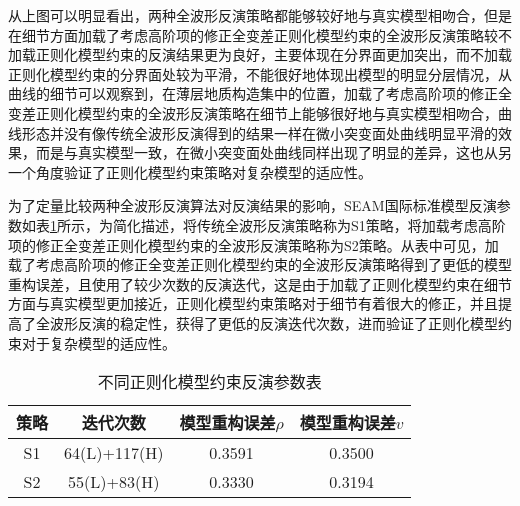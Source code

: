 \documentclass[12pt]{article}
\begin{document}
\par
从上图可以明显看出，两种全波形反演策略都能够较好地与真实模型相吻合，但是在细节方面加载了考虑高阶项的修正全变差正则化模型约束的全波形反演策略较不加载正则化模型约束的反演结果更为良好，主要体现在分界面更加突出，而不加载正则化模型约束的分界面处较为平滑，不能很好地体现出模型的明显分层情况，从曲线的细节可以观察到，在薄层地质构造集中的位置，加载了考虑高阶项的修正全变差正则化模型约束的全波形反演策略在细节上能够很好地与真实模型相吻合，曲线形态并没有像传统全波形反演得到的结果一样在微小突变面处曲线明显平滑的效果，而是与真实模型一致，在微小突变面处曲线同样出现了明显的差异，这也从另一个角度验证了正则化模型约束策略对复杂模型的适应性。
\par
为了定量比较两种全波形反演算法对反演结果的影响，SEAM国际标准模型反演参数如表\ref{SEAMTab}所示，为简化描述，将传统全波形反演策略称为S1策略，将加载考虑高阶项的修正全变差正则化模型约束的全波形反演策略称为S2策略。从表中可见，加载了考虑高阶项的修正全变差正则化模型约束的全波形反演策略得到了更低的模型重构误差，且使用了较少次数的反演迭代，这是由于加载了正则化模型约束在细节方面与真实模型更加接近，正则化模型约束策略对于细节有着很大的修正，并且提高了全波形反演的稳定性，获得了更低的反演迭代次数，进而验证了正则化模型约束对于复杂模型的适应性。
\begin{table}[H]
\centering
\caption{不同正则化模型约束反演参数表}\label{SEAMTab}
\renewcommand\tabcolsep{1em}
\begin{tabular}{cccc}
\toprule
{策略} & {迭代次数} & {模型重构误差$\rho$} & {模型重构误差$v$}\\
\midrule 
S1 & 64(L)+117(H) & 0.3591 & 0.3500\\
S2 & 55(L)+83(H) & 0.3330 & 0.3194\\
\bottomrule
\end{tabular}
\end{table}
\setcounter{figure}{0}
\setcounter{table}{0}
\setcounter{algorithm}{0}
\newpage
\end{document}
